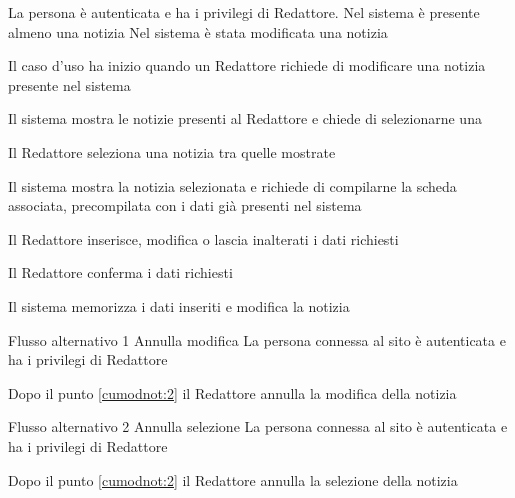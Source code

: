 \tabcuvspace

{}
{La persona è autenticata e ha i privilegi di Redattore. Nel sistema è presente almeno una notizia}
{Nel sistema è stata modificata una notizia}
{\begin{enumCU}
	\item Il caso d'uso ha inizio quando un Redattore richiede di modificare una notizia presente nel sistema
	\item Il sistema mostra le notizie presenti al Redattore e chiede di selezionarne una \label{cumodnot:1}
	\item Il Redattore seleziona una notizia tra quelle mostrate
	\item Il sistema mostra la notizia selezionata e richiede di compilarne la scheda associata, precompilata con i dati già presenti nel sistema 
	\item Il Redattore inserisce, modifica o lascia inalterati i dati richiesti \label{cumodnot:2}
	\item Il Redattore conferma i dati richiesti
	\item Il sistema memorizza i dati inseriti e modifica la notizia
\end{enumCU}}
%
{Flusso alternativo 1}%
{Annulla modifica}%
{La persona connessa al sito è autenticata e ha i privilegi di Redattore}%
{\postNulle}%
{\begin{enumCU}
		\item Dopo il punto \ref{cumodnot:2} il Redattore annulla la modifica della notizia
\end{enumCU}}%
%
{Flusso alternativo 2}%
{Annulla selezione}%
{La persona connessa al sito è autenticata e ha i privilegi di Redattore}%
{\postNulle}%
{\begin{enumCU}
		\item Dopo il punto \ref{cumodnot:2} il Redattore annulla la selezione della notizia
\end{enumCU}}%

\tabcuvspace

